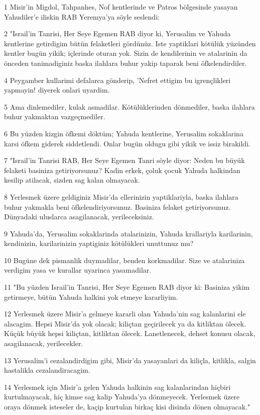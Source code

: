 \par 1 Misir'in Migdol, Tahpanhes, Nof kentlerinde ve Patros bölgesinde yasayan Yahudiler'e iliskin RAB Yeremya'ya söyle seslendi:
\par 2 "Israil'in Tanrisi, Her Seye Egemen RAB diyor ki, Yerusalim ve Yahuda kentlerine getirdigim bütün felaketleri gördünüz. Iste yaptiklari kötülük yüzünden kentler bugün yikik; içlerinde oturan yok. Sizin de kendilerinin ve atalarinin da önceden tanimadiginiz baska ilahlara buhur yakip taparak beni öfkelendirdiler.
\par 4 Peygamber kullarimi defalarca gönderip, 'Nefret ettigim bu igrençlikleri yapmayin! diyerek onlari uyardim.
\par 5 Ama dinlemediler, kulak asmadilar. Kötülüklerinden dönmediler, baska ilahlara buhur yakmaktan vazgeçmediler.
\par 6 Bu yüzden kizgin öfkemi döktüm; Yahuda kentlerine, Yerusalim sokaklarina karsi öfkem giderek siddetlendi. Onlar bugün oldugu gibi yikik ve issiz birakildi.
\par 7 "Israil'in Tanrisi RAB, Her Seye Egemen Tanri söyle diyor: Neden bu büyük felaketi basiniza getiriyorsunuz? Kadin erkek, çoluk çocuk Yahuda halkindan kesilip atilacak, sizden sag kalan olmayacak.
\par 8 Yerlesmek üzere geldiginiz Misir'da ellerinizin yaptiklariyla, baska ilahlara buhur yakmakla beni öfkelendiriyorsunuz. Basiniza felaket getiriyorsunuz. Dünyadaki uluslarca asagilanacak, yerileceksiniz.
\par 9 Yahuda'da, Yerusalim sokaklarinda atalarinizin, Yahuda krallariyla karilarinin, kendinizin, karilarinizin yaptiginiz kötülükleri unuttunuz mu?
\par 10 Bugüne dek pismanlik duymadilar, benden korkmadilar. Size ve atalariniza verdigim yasa ve kurallar uyarinca yasamadilar.
\par 11 "Bu yüzden Israil'in Tanrisi, Her Seye Egemen RAB diyor ki: Basiniza yikim getirmeye, bütün Yahuda halkini yok etmeye kararliyim.
\par 12 Yerlesmek üzere Misir'a gelmeye kararli olan Yahuda'nin sag kalanlarini ele alacagim. Hepsi Misir'da yok olacak; kiliçtan geçirilecek ya da kitliktan ölecek. Küçük büyük hepsi kiliçtan, kitliktan ölecek. Lanetlenecek, dehset konusu olacak, asagilanacak, yerilecekler.
\par 13 Yerusalim'i cezalandirdigim gibi, Misir'da yasayanlari da kiliçla, kitlikla, salgin hastalikla cezalandiracagim.
\par 14 Yerlesmek için Misir'a gelen Yahuda halkinin sag kalanlarindan hiçbiri kurtulmayacak, hiç kimse sag kalip Yahuda'ya dönmeyecek. Yerlesmek üzere oraya dönmek isteseler de, kaçip kurtulan birkaç kisi disinda dönen olmayacak."
